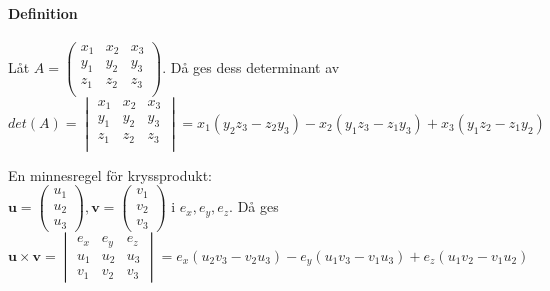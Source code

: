 \paragraph{Definition} Låt $A=\begin{pmatrix}
    x_{1} & x_{2} & x_{3}\\
    y_{1} & y_{2} & y_{3}\\
    z_{1} & z_{2} & z_{3}\\
\end{pmatrix}$.
Då ges dess determinant av $det(A)=\begin{vmatrix}
    x_{1} & x_{2} & x_{3}\\
    y_{1} & y_{2} & y_{3}\\
    z_{1} & z_{2} & z_{3}\\
\end{vmatrix}=x_{1}(y_{2}z_{3}-z_{2}y_{3})-x_{2}(y_{1}z_{3}-z_{1}y_{3})+x_{3}(y_{1}z_{2}-z_{1}y_{2})$

En minnesregel för kryssprodukt:\\
$\bm{u}=\begin{pmatrix}
    u_{1}\\u_{2}\\u_{3}
\end{pmatrix},
\bm{v}=\begin{pmatrix}
    v_{1}\\v_{2}\\v_{3}
\end{pmatrix}$
i $e_{x},e_{y},e_{z}$.
Då ges $\bm{u}\times \bm{v}=\begin{vmatrix}
    e_{x}&e_{y}&e_{z}\\
    u_{1}&u_{2}&u_{3}\\
    v_{1}&v_{2}&v_{3}
\end{vmatrix}=e_{x}(u_{2}v_{3}-v_{2}u_{3})-e_{y}(u_{1}v_{3}-v_{1}u_{3})+e_{z}(u_{1}v_{2}-v_{1}u_{2})$